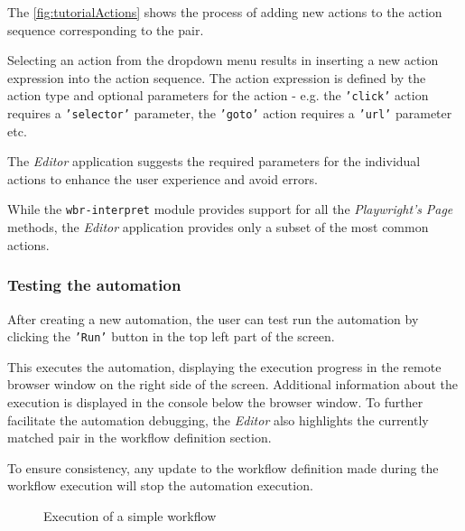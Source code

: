 The \autoref{fig:tutorialActions} shows the process of adding new actions to the action sequence corresponding to the pair.

Selecting an action from the dropdown menu results in inserting a new action expression into the action sequence.
The action expression is defined by the action type and optional parameters for the action - e.g. the \texttt{'click'} action requires a \texttt{'selector'} parameter,
the \texttt{'goto'} action requires a \texttt{'url'} parameter etc.

The \textit{Editor} application suggests the required parameters for the individual actions to enhance the user experience and avoid errors.

While the \texttt{wbr-interpret} module provides support for all the \textit{Playwright's} \textit{Page} methods, the \textit{Editor} application provides only a subset of the most common actions.

\subsubsection{Testing the automation}

After creating a new automation, the user can test run the automation by clicking the \texttt{'Run'} button in the top left part of the screen.

This executes the automation, displaying the execution progress in the remote browser window on the right side of the screen.
Additional information about the execution is displayed in the console below the browser window.
To further facilitate the automation debugging, the \textit{Editor} also highlights the currently matched pair in the workflow definition section.

To ensure consistency, any update to the workflow definition made during the workflow execution will stop the automation execution.

\begin{figure}[!h]
    \begin{center}
    \end{center}
    \caption{Execution of a simple workflow}
\end{figure}